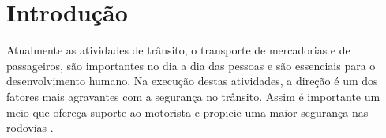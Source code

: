 \documentclass[mestrado, pre-defesa, english, brazil]{packages/icmc}
\begin{document}
\textual

%
%
%
%
%
%
%
%
%
%
%
%
%
%
%

\chapter{Introdução} \label{intro}

Atualmente as atividades de trânsito, o transporte de mercadorias e de passageiros, são importantes no dia a dia das pessoas e são essenciais para o desenvolvimento humano. Na execução destas atividades, a direção é um dos fatores mais agravantes com a segurança no trânsito. Assim é importante um meio que ofereça suporte ao motorista e propicie uma maior segurança nas rodovias \cite{Fuentes-2011}.
\end{document}
